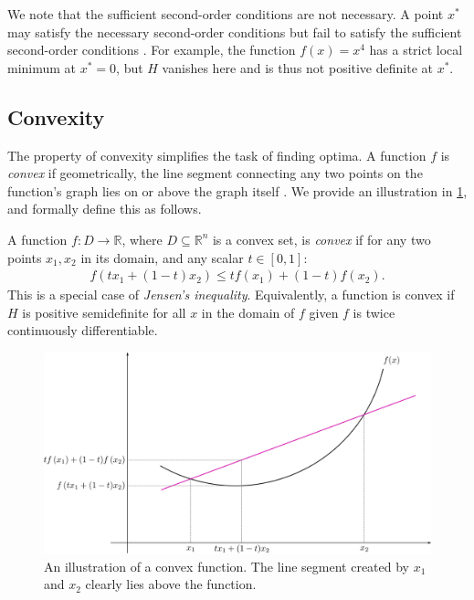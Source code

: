 We note that the sufficient second-order conditions are not necessary. A point $x^*$ may satisfy the necessary second-order conditions but fail to satisfy the sufficient second-order conditions \citep{NoceWrig06}. For example, the function $f(x) = x^4$ has a strict local minimum at $x^* = 0$, but $H$ vanishes here and is thus not positive definite at $x^*$. 

\subsection{Convexity}
\label{ssec:convexity}

The property of convexity simplifies the task of finding optima. A function $f$ is \textit{convex} if geometrically, the line segment connecting any two points on the function's graph lies on or above the graph itself \citep{cvbook, NoceWrig06, mml_book}. We provide an illustration in \cref{fig:convex_function}, and formally define this as follows.

\begin{definition}
    A function $f: D \to \mathbb{R}$, where $D \subseteq \mathbb{R}^n$ is a convex set, is \textit{convex} if for any two points $x_1, x_2$ in its domain, and any scalar $t \in [0, 1]$:
    \begin{align}
        f(t x_1 + (1-t)x_2) \leq t f(x_1) + (1-t)f(x_2).
    \end{align}
    This is a special case of \textit{Jensen's inequality}. Equivalently, a function is convex if $H$ is positive semidefinite for all $x$ in the domain of $f$ given $f$ is twice continuously differentiable.
\end{definition}

\begin{figure}[h]
    \centering
    \includegraphics[width=0.9\linewidth]{figures/2background/ConvexFunction.svg.png}
    \caption{An illustration of a convex function. The line segment created by $x_1$ and $x_2$ clearly lies above the function.}
    \label{fig:convex_function}
\end{figure}

